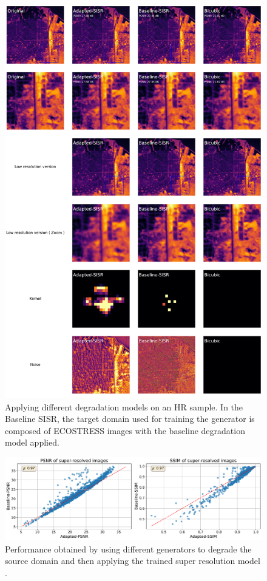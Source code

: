         \begin{figure}[ht!]
            \centering
            \includegraphics[scale=0.28]{Includes/6-source_prediction-sample.pdf}
            \caption{Applying different degradation models on an HR sample. In the Baseline SISR, the target domain used for training the generator is composed of ECOSTRESS images with the baseline degradation model applied.  }
            \label{fig:6-source_domain_sample}
        \end{figure}


        \begin{figure}[h!]
            \centering
            \includegraphics[width=\linewidth]{Includes/5-source-domain-sr-comparison.pdf}
            \caption{Performance obtained by using different generators to degrade the source domain and then applying the trained super resolution model .}
            \label{fig:5-source-domain-sr-comparison}
        \end{figure}


